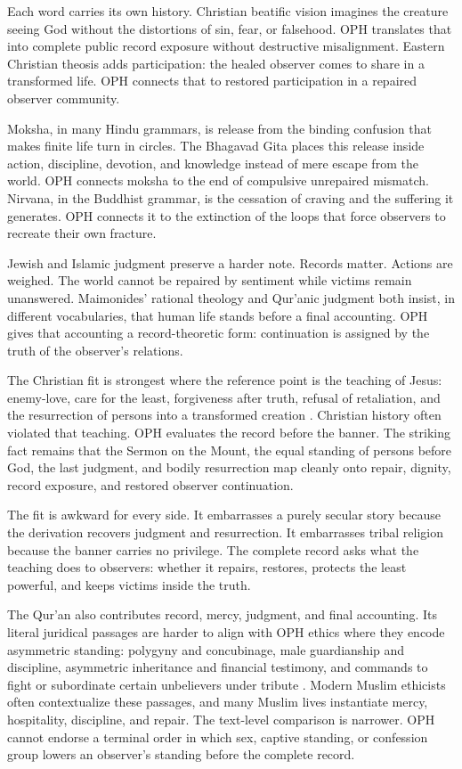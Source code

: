 \documentclass[11pt]{article}
\theoremstyle{remark}
\theoremstyle{plain}
\begin{document}
Each word carries its own history. Christian beatific vision imagines the
creature seeing God without the distortions of sin, fear, or falsehood. OPH
translates that into complete public record exposure without destructive
misalignment. Eastern Christian theosis adds participation: the healed observer
comes to share in a transformed life. OPH connects that to restored
participation in a repaired observer community.

Moksha, in many Hindu grammars, is release from the binding confusion that makes
finite life turn in circles. The Bhagavad Gita places this release inside action,
discipline, devotion, and knowledge instead of mere escape from the world. OPH
connects moksha to the end of compulsive unrepaired mismatch. Nirvana, in the
Buddhist grammar, is the cessation of craving and the suffering it generates.
OPH connects it to the extinction of the loops that force observers to recreate
their own fracture.

Jewish and Islamic judgment preserve a harder note. Records matter. Actions are
weighed. The world cannot be repaired by sentiment while victims remain
unanswered. Maimonides' rational theology and Qur'anic judgment both insist,
in different vocabularies, that human life stands before a final accounting.
OPH gives that accounting a record-theoretic form: continuation is assigned by
the truth of the observer's relations.

The Christian fit is strongest where the reference point is the teaching of
Jesus: enemy-love, care for the least, forgiveness after truth, refusal of
retaliation, and the resurrection of persons into a transformed creation
\cite{Bible}. Christian history often violated that teaching. OPH evaluates the
record before the banner. The striking fact remains that the Sermon on the Mount,
the equal standing of persons before God, the last judgment, and bodily
resurrection map cleanly onto repair, dignity, record exposure, and restored
observer continuation.

The fit is awkward for every side. It embarrasses a purely secular story because
the derivation recovers judgment and resurrection. It embarrasses tribal
religion because the banner carries no privilege. The complete record asks what
the teaching does to observers: whether it repairs, restores, protects the
least powerful, and keeps victims inside the truth.

The Qur'an also contributes record, mercy, judgment, and final accounting. Its
literal juridical passages are harder to align with OPH ethics where they encode
asymmetric standing: polygyny and concubinage, male guardianship and discipline,
asymmetric inheritance and financial testimony, and commands to fight or
subordinate certain unbelievers under tribute
\cite{Quran,Quran4304,Quran4324,Quran4334,Quran4211,Quran2282,Quran4905,Quran4929}.
Modern Muslim ethicists often contextualize these passages, and many Muslim
lives instantiate mercy, hospitality, discipline, and repair. The text-level
comparison is narrower. OPH cannot endorse a terminal order in which sex,
captive standing, or confession group lowers an observer's standing before the
complete record.
\end{document}
